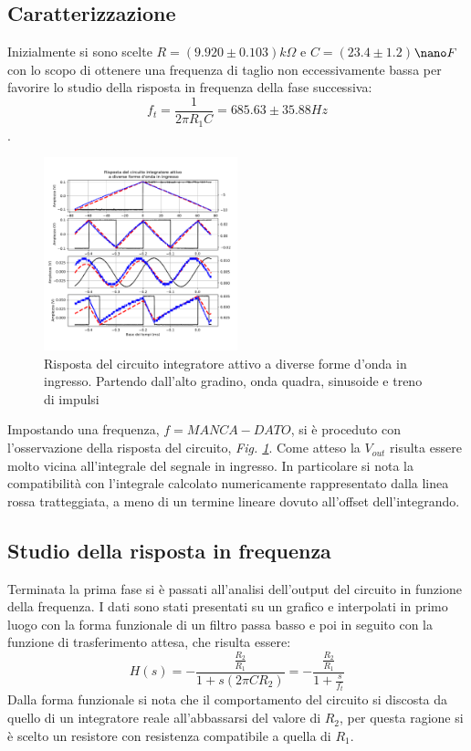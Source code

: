 \documentclass[journal]{IEEEtran}
\begin{document}
\subsection{\textbf{Caratterizzazione}}
Inizialmente si sono scelte $R =$$(9.920 \pm 0.103)$$k\Omega$ e $C=$$(23.4 \pm 1.2)$$\nano F$ con lo scopo di ottenere una frequenza di taglio non eccessivamente bassa per favorire lo studio della risposta in frequenza della fase successiva: \[f_{t} = \frac{1}{2 \pi R_{1} C}= 685.63 \pm 35.88 Hz\].

\begin{figure}[H]%
\begin {center}
\includegraphics[width=0.50\textwidth]{analysis/output/OPA-integ-with-res.pdf}
\caption{Risposta del circuito integratore attivo a diverse forme d'onda in ingresso. Partendo dall'alto gradino, onda quadra, sinusoide e treno di impulsi}
\label{fig:OPA-integ-res}
\end {center}
\end{figure}
Impostando una frequenza, $f= MANCA-DATO$, si è proceduto con l'osservazione della risposta del circuito, \textit{Fig. \ref{fig:OPA-integ-res}}. Come atteso la $V_{out}$ risulta essere molto vicina all'integrale del segnale in ingresso. In particolare si nota la compatibilità con l'integrale calcolato numericamente rappresentato dalla linea rossa tratteggiata, a meno di un termine lineare dovuto all'offset dell'integrando.
\subsection{\textbf{Studio della risposta in frequenza}}

Terminata la prima fase si è passati all'analisi dell'output del circuito in funzione della frequenza. I dati sono stati presentati su un grafico e interpolati in primo luogo con la forma funzionale di un filtro passa basso e poi in seguito con la funzione di trasferimento attesa, che risulta essere: 
\[H(s) = -\frac{\frac{R_2}{R_1}}{1 + s(2 \pi C R_2)} = -\frac{\frac{R_2}{R_1}}{1 + \frac{s}{f_t}}\]
Dalla forma funzionale si nota che il comportamento del circuito si discosta da quello di un integratore reale all'abbassarsi del valore di $R_2$, per questa ragione si è scelto un resistore con resistenza compatibile a quella di $R_1$.
\end{document}
